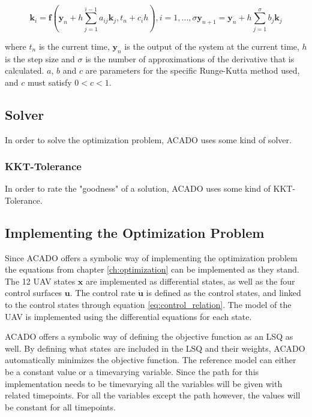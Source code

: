 \begin{subequations}
\begin{equation}
	\mathbf{k}_i = \mathbf{f}(\mathbf{y}_n + h \sum_{j=1}^{i-1} a_{ij}\mathbf{k}_j, t_n + c_ih), i = 1, ..., \sigma
\end{equation}
\begin{equation}
	\mathbf{y}_{n+1} = \mathbf{y}_n + h \sum_{j=1}^\sigma b_j \mathbf{k}_j
\end{equation}
\end{subequations}

where $t_n$ is the current time, $\mathbf{y}_n$ is the output of the system at the current time, $h$ is the step size and $\sigma$ is the number of approximations of the derivative that is calculated. $a$, $b$ and $c$ are parameters for the specific Runge-Kutta method used, and $c$ must satisfy $0 < c < 1$.

\subsection{Solver}

In order to solve the optimization problem, ACADO uses some kind of solver.

\subsubsection{KKT-Tolerance}

In order to rate the "goodness" of a solution, ACADO uses some kind of KKT-Tolerance.


\subsection{Implementing the Optimization Problem}

Since ACADO offers a symbolic way of implementing the optimization problem the equations from chapter \ref{ch:optimization} can be implemented as they stand. The 12 UAV states $\mathbf{x}$ are implemented as differential states, as well as the four control surfaces $\mathbf{u}$. The control rate $\mathbf{\dot{u}}$ is defined as the control states, and linked to the control states through equation \ref{eq:control_relation}. The model of the UAV is implemented using the differential equations for each state.

ACADO offers a symbolic way of defining the objective function as an LSQ as well. By defining what states are included in the LSQ and their weights, ACADO automatically minimizes the objective function. The reference model can either be a constant value or a timevarying variable. Since the path for this implementation needs to be timevarying all the variables will be given with related timepoints. For all the variables except the path however, the values will be constant for all timepoints.

